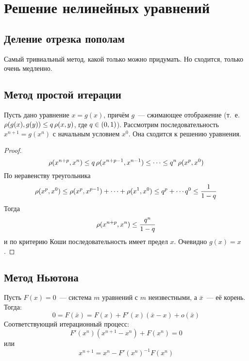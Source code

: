 
\section{Решение нелинейных уравнений}

\subsection{Деление отрезка пополам}
Самый тривиальный метод, какой только можно придумать. Но сходится, только очень медленно.

\subsection{Метод простой итерации}
Пусть дано уравнение $x = g(x)$, причём $g$ — сжимающее отображение (т. е. $\operatorname{\rho}(g(x), g(y)) \leq q\operatorname{\rho}(x, y)$, где $q \in \intoo{0, 1}$). Рассмотрим последовательность $x^{n+1} = g(x^n)$ с начальным условием $x^0$. Она сходится к решению уравнения.
\begin{proof}
	\[ \operatorname{\rho}(x^{n+p}, x^n) \leq q \operatorname{\rho}(x^{n+p-1}, x^{n-1}) \leq \dotsb \leq q^n \operatorname{\rho}(x^p, x^0) \]
	По неравенству треугольника
	\[ \operatorname{\rho}(x^p, x^0) \leq \operatorname{\rho}(x^p, x^{p-1}) + \dotsb + \operatorname{\rho}(x^1, x^0) \leq q^p + \dotsb q^0 \leq \frac{1}{1 - q} \]
	Тогда
	\[ \operatorname{\rho}(x^{n+p}, x^n) \leq \frac{q^n}{1 - q} \]
	и по критерию Коши последовательность имеет предел $x$. Очевидно $g(x) = x$.
\end{proof}

\subsection{Метод Ньютона}
Пусть $F(x) = 0$ — система $m$ уравнений с $m$ неизвестными, а $\bar x$ — её корень. Тогда:
\[ 0 = F(\bar x) = F(x) + F'(x) (\bar x - x) + o(\bar x) \]
Соответствующий итерационный процесс:
\[ F'(x^n)(x^{n+1} - x^n) + F(x^n) = 0 \]
или
\[ x^{n+1} = x^n - F'(x^n)^{-1} F(x^n) \]

